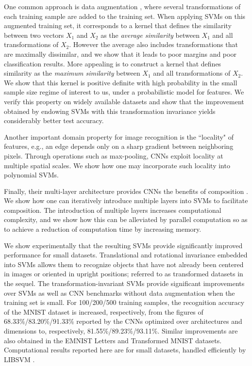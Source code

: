 \documentclass{article}
\theoremstyle{plain}
\theoremstyle{definition}
\theoremstyle{remark}
\begin{document}
One common approach is data augmentation \cite{shorten2019survey, cubuk2018autoaugment}, where several transformations of each training sample are added to the training set. When applying SVMs on this augmented training set, it corresponds to a kernel that defines the similarity between two vectors $X_1$ and $X_2$ as the {\textit{average similarity}} between $X_1$ and all transformations of $X_2$. However the average also includes transformations that are maximally dissimilar, and we show that it leads to poor margins and poor classification results. More appealing is to construct a kernel that defines similarity as the \textit{maximum similarity} between $X_1$ and all transformations of $X_2$. We show that this kernel is positive definite with high probability in the small sample size regime of interest to us, under a probabilistic model for features. We verify this property on widely available datasets and show that the improvement obtained by endowing SVMs with this transformation invariance yields considerably better test accuracy. 

Another important domain property for image recognition is the ``locality" of features, e.g., an edge depends only on a sharp gradient between neighboring pixels. Through operations such as max-pooling, CNNs exploit locality at multiple spatial scales. We show how one may incorporate such locality into polynomial SVMs. 

Finally, their multi-layer architecture provides CNNs the benefits of composition \cite{daubechies2021nonlinear}. We show how one can iteratively introduce multiple layers into SVMs to facilitate composition. The introduction of multiple layers increases computational complexity, and we show how this can be alleviated by parallel computation so as to achieve a reduction of computation time by increasing memory.

We show experimentally that the resulting SVMs provide significantly improved performance for small datasets. Translational and rotational invariance embedded into SVMs allows them to recognize objects that have not already been centered in images or oriented in upright positions; referred to as transformed datasets in the sequel. The transformation-invariant SVMs provide significant improvements over SVMs as well as CNN benchmarks without data augmentation when the training set is small. For 100/200/500 training samples, the recognition accuracy of the MNIST dataset \cite{lecun-mnisthandwrittendigit-2010} is increased, respectively, from the figures of 68.33\%/83.20\%/91.33\% reported by the CNNs optimized over architectures and dimensions \cite{d2020structural} to, respectively, 81.55\%/89.23\%/93.11\%. Similar improvements are also obtained in the EMNIST Letters \cite{cohen2017emnist} and Transformed MNIST datasets. Computational results reported here are for small datasets, handled efficiently by LIBSVM \cite{chang2011libsvm}.
\end{document}
